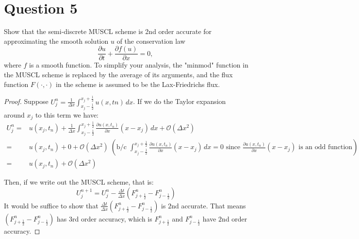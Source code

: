 \section{Question 5}

\begin{question}
    Show that the semi-discrete MUSCL scheme is 2nd order accurate for approximating the smooth solution $u$ of the conservation law
    $$
    \frac{\partial u}{\partial t}+\frac{\partial f(u)}{\partial x}=0 \text {, }
    $$
    where $f$ is a smooth function. To simplify your analysis, the "minmod" function in the MUSCL scheme is replaced by the average of its arguments, and the flux function $F(\cdot, \cdot)$ in the scheme is assumed to be the Lax-Friedrichs flux.
\end{question}

\begin{answer}
    \begin{proof}
        Suppose $U_j^n = \tfrac{1}{\Delta x}\int_{x_j-\frac{1}{2}}^{x_j+\frac{1}{2}}u(x,tn)\,dx$. If we do the Taylor expansion around $x_j$ to this term we have:
        \begin{equation}
            \begin{aligned}
                U_j^n = &u(x_j,t_n) +\tfrac{1}{\Delta x}\int_{x_j-\frac{1}{2}}^{x_j+\frac{1}{2}}\tfrac{\partial u(x,t_n)}{\partial x}(x-x_j)\,dx + \mathcal{O}(\Delta x^2)\\
                = &u(x_j,t_n) + 0 + \mathcal{O}(\Delta x^2) \; \left(\text{b/c $\int_{x_j-\frac{1}{2}}^{x_j+\frac{1}{2}}\tfrac{\partial u(x,t_n)}{\partial x}(x-x_j)\,dx = 0$ since $\tfrac{\partial u(x,t_n)}{\partial x}(x-x_j)$ is an odd function}\right)\\
                = &u(x_j,t_n) + \mathcal{O}(\Delta x^2)
            \end{aligned}
        \end{equation}
        
        Then, if we write out the MUSCL scheme, that is:
        \begin{equation}
            U_j^{n+1} = U_j^n - \tfrac{\Delta t}{\Delta x}\left(F_{j+\frac{1}{2}}^n - F_{j-\frac{1}{2}}^n\right)
        \end{equation}
        It would be suffice to show that $\tfrac{\Delta t}{\Delta x}\left(F_{j+\frac{1}{2}}^n - F_{j-\frac{1}{2}}^n\right)$ is $2$nd accurate. That means $\left(F_{j+\frac{1}{2}}^n - F_{j-\frac{1}{2}}^n\right)$ has $3$rd order accuracy, which is $F_{j+\frac{1}{2}}^n$ and $F_{j-\frac{1}{2}}^n$ have $2$nd order accuracy.
        

\end{proof}
\end{answer}
